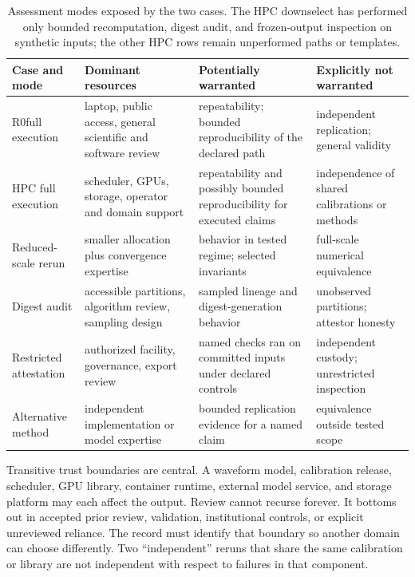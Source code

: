 \documentclass[11pt]{article}
\newcommand{\Rzero}{R0}
\begin{document}
\begin{table}[ht]
\centering
\small
\caption{Assessment modes exposed by the two cases. The HPC downselect has performed only bounded recomputation, digest audit, and frozen-output inspection on synthetic inputs; the other HPC rows remain unperformed paths or templates.}
\label{tab:modes}
\begin{tabularx}{\textwidth}{@{}L{0.18\textwidth}L{0.18\textwidth}X X@{}}
\toprule
Case and mode & Dominant resources & Potentially warranted & Explicitly not warranted \\
\midrule
\Rzero full execution & laptop, public access, general scientific and software review & repeatability; bounded reproducibility of the declared path & independent replication; general validity \\
HPC full execution & scheduler, GPUs, storage, operator and domain support & repeatability and possibly bounded reproducibility for executed claims & independence of shared calibrations or methods \\
Reduced-scale rerun & smaller allocation plus convergence expertise & behavior in tested regime; selected invariants & full-scale numerical equivalence \\
Digest audit & accessible partitions, algorithm review, sampling design & sampled lineage and digest-generation behavior & unobserved partitions; attestor honesty \\
Restricted attestation & authorized facility, governance, export review & named checks ran on committed inputs under declared controls & independent custody; unrestricted inspection \\
Alternative method & independent implementation or model expertise & bounded replication evidence for a named claim & equivalence outside tested scope \\
\bottomrule
\end{tabularx}
\end{table}
\clearpage

Transitive trust boundaries are central. A waveform model, calibration release, scheduler, GPU library, container runtime, external model service, and storage platform may each affect the output. Review cannot recurse forever. It bottoms out in accepted prior review, validation, institutional controls, or explicit unreviewed reliance. The record must identify that boundary so another domain can choose differently. Two ``independent'' reruns that share the same calibration or library are not independent with respect to failures in that component.
\end{document}
